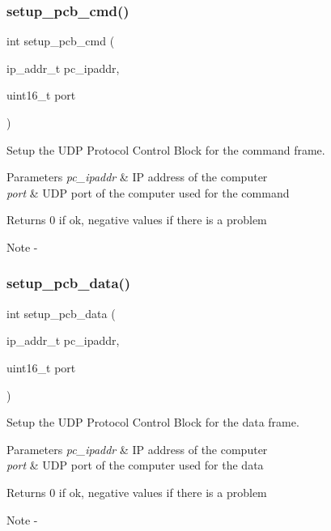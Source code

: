 \subsubsection{setup\_pcb\_cmd()}
{\footnotesize\ttfamily int setup\+\_\+pcb\+\_\+cmd (\begin{DoxyParamCaption}\item[{ip\+\_\+addr\+\_\+t}]{pc\+\_\+ipaddr,  }\item[{uint16\+\_\+t}]{port }\end{DoxyParamCaption})}



Setup the U\+DP Protocol Control Block for the command frame. 


\begin{DoxyParams}{Parameters}
{\em pc\+\_\+ipaddr} & IP address of the computer \\
\hline
{\em port} & U\+DP port of the computer used for the command\\
\hline
\end{DoxyParams}
\begin{DoxyReturn}{Returns}
0 if ok, negative values if there is a problem
\end{DoxyReturn}
\begin{DoxyNote}{Note}
-\/ 
\end{DoxyNote}
\mbox{\label{udp__peripheral_8c_a4107e96522a377bc24430731773ee4d9}} 
\subsubsection{setup\_pcb\_data()}
{\footnotesize\ttfamily int setup\+\_\+pcb\+\_\+data (\begin{DoxyParamCaption}\item[{ip\+\_\+addr\+\_\+t}]{pc\+\_\+ipaddr,  }\item[{uint16\+\_\+t}]{port }\end{DoxyParamCaption})}



Setup the U\+DP Protocol Control Block for the data frame. 


\begin{DoxyParams}{Parameters}
{\em pc\+\_\+ipaddr} & IP address of the computer \\
\hline
{\em port} & U\+DP port of the computer used for the data\\
\hline
\end{DoxyParams}
\begin{DoxyReturn}{Returns}
0 if ok, negative values if there is a problem
\end{DoxyReturn}
\begin{DoxyNote}{Note}
-\/ 
\end{DoxyNote}
\mbox{\label{udp__peripheral_8c_add95cc1d5556c34f8c40639de2b37057}} 
